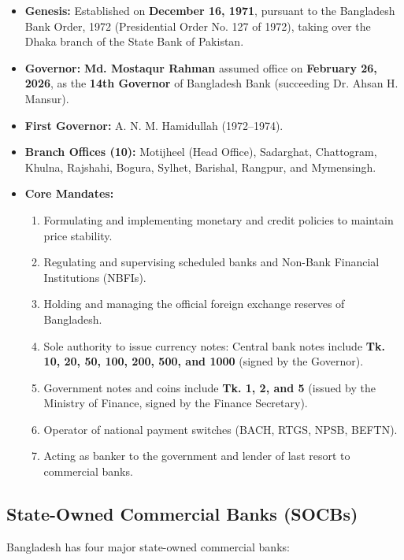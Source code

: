 \begin{itemize}
  \item \textbf{Genesis:} Established on \textbf{December 16, 1971}, pursuant to the Bangladesh Bank Order, 1972 (Presidential Order No. 127 of 1972), taking over the Dhaka branch of the State Bank of Pakistan.
  \item \textbf{Governor:} \textbf{Md. Mostaqur Rahman} assumed office on \textbf{February 26, 2026}, as the \textbf{14th Governor} of Bangladesh Bank (succeeding Dr. Ahsan H. Mansur).
  \item \textbf{First Governor:} A. N. M. Hamidullah (1972--1974).
  \item \textbf{Branch Offices (10):} Motijheel (Head Office), Sadarghat, Chattogram, Khulna, Rajshahi, Bogura, Sylhet, Barishal, Rangpur, and Mymensingh.
  \item \textbf{Core Mandates:}
  \begin{enumerate}
    \item Formulating and implementing monetary and credit policies to maintain price stability.
    \item Regulating and supervising scheduled banks and Non-Bank Financial Institutions (NBFIs).
    \item Holding and managing the official foreign exchange reserves of Bangladesh.
    \item Sole authority to issue currency notes: Central bank notes include \textbf{Tk. 10, 20, 50, 100, 200, 500, and 1000} (signed by the Governor).
    \item Government notes and coins include \textbf{Tk. 1, 2, and 5} (issued by the Ministry of Finance, signed by the Finance Secretary).
    \item Operator of national payment switches (BACH, RTGS, NPSB, BEFTN).
    \item Acting as banker to the government and lender of last resort to commercial banks.
  \end{enumerate}
\end{itemize}

\medskip

\subsection{State-Owned Commercial Banks (SOCBs)}

Bangladesh has four major state-owned commercial banks:


